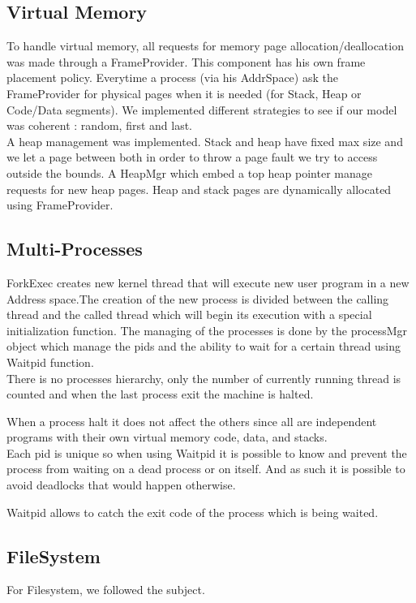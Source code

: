 \subsection{Virtual Memory}

To handle virtual memory, all requests for memory page allocation/deallocation
was made through a FrameProvider. This component has his own frame placement
policy. Everytime a process (via his AddrSpace) ask the FrameProvider for
physical pages when it is needed (for Stack, Heap or Code/Data segments).
We implemented different strategies to see if our model was coherent : random,
first and last.\\

A heap management was implemented. Stack and heap have fixed max size and
we let a page between both in order to throw a page fault we try to access
outside the bounds. A HeapMgr which embed a top heap pointer manage requests for
new heap pages.
Heap and stack pages are dynamically allocated using FrameProvider.

\subsection{Multi-Processes}
ForkExec creates new kernel thread that will execute new user program in a new
Address space.The creation of the new process is divided between the calling
thread and the called thread which will begin its execution with a special
initialization function. The managing of the processes is done by the processMgr
object which manage the pids and the ability to wait for a certain thread using
Waitpid function.\\

There is no processes hierarchy, only the number of currently running thread is
counted and when the last process exit the machine is halted.

When a process halt it does not affect the others since all are independent
programs with their own virtual memory code, data, and stacks.\\

Each pid is unique so when using Waitpid it is possible to know and prevent the
process from waiting on a dead process or on itself. And as such it is possible
to avoid deadlocks that would happen otherwise.

Waitpid allows to catch the exit code of the process which is being waited.

\subsection{FileSystem}
For Filesystem, we followed the subject.

